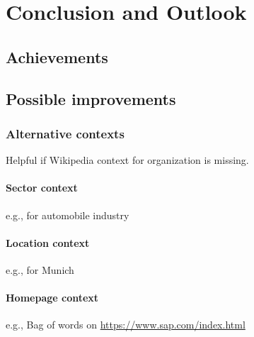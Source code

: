 \section{Conclusion and Outlook}
\label{sec:conclusion}
\subsection{Achievements}
\subsection{Possible improvements}

\subsubsection{Alternative contexts}
Helpful if Wikipedia context for organization is missing.
\paragraph{Sector context}
e.g., for automobile industry
\paragraph{Location context}
e.g., for Munich
\paragraph{Homepage context}
e.g., Bag of words on \url{https://www.sap.com/index.html}